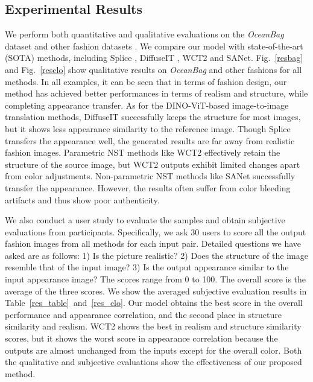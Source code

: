 \subsection{Experimental Results}
We perform both quantitative and qualitative evaluations on the \textit{OceanBag} dataset and other fashion datasets \cite{clothing_dataset,fashion_dataset}. We compare our model with state-of-the-art (SOTA) methods, including Splice \cite{tumanyan2022splicing}, DiffuseIT \cite{kwon2022diffusion}, WCT2 \cite{yoo2019photorealistic} and SANet\cite{park2019arbitrary}. 
Fig.~\ref{resbag} and Fig.~\ref{resclo} show qualitative results on \textit{OceanBag} and other fashions for all methods. In all examples, it can be seen that in terms of fashion design, our method has achieved better performances in terms of realism and structure, while completing appearance transfer. 
As for the DINO-ViT-based image-to-image translation methods, DiffuseIT successfully keeps the structure for most images, but it shows less appearance similarity to the reference image. Though Splice transfers the appearance well, the generated results are far away from realistic fashion images.
Parametric NST methods like WCT2 effectively retain the structure of the source image, but WCT2 outputs exhibit limited changes apart from color adjustments. Non-parametric NST methods like SANet successfully transfer the appearance. However, the results often suffer from color bleeding artifacts and thus show poor authenticity.

We also conduct a user study to evaluate the samples and obtain subjective evaluations from participants. Specifically, we ask 30 users to score all the output fashion images from all methods for each input pair. Detailed questions we have asked are as follows: 1) Is the picture realistic? 2) Does the structure of the image resemble that of the input image? 3) Is the output appearance similar to the input appearance image? The scores range from 0 to 100. The overall score is the average of the three scores.
We show the averaged subjective evaluation results in Table~\ref{res_table}~and~\ref{res_clo}. Our model obtains the best score in the overall performance and appearance correlation, and the second place in structure similarity and realism. WCT2 shows the best in realism and structure similarity scores, but it shows the worst score in appearance correlation because the outputs are almost unchanged from the inputs except for the overall color.
Both the qualitative and subjective evaluations show the effectiveness of our proposed method.


